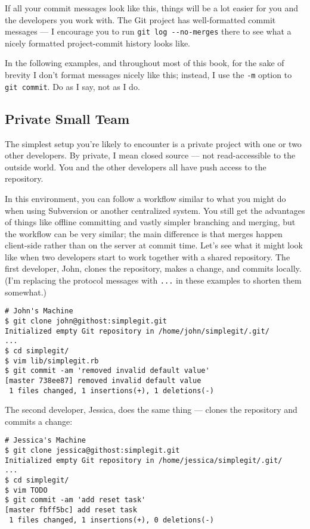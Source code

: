 \documentclass[a4paper]{book}
\begin{document}
If all your commit messages look like this, things will be a lot easier for you and the developers you work with. The Git project has well-formatted commit messages --- I encourage you to run \texttt{git log -{}-no-merges} there to see what a nicely formatted project-commit history looks like.

In the following examples, and throughout most of this book, for the sake of brevity I don't format messages nicely like this; instead, I use the \texttt{-m} option to \texttt{git commit}. Do as I say, not as I do.

\subsection{Private Small Team}

The simplest setup you're likely to encounter is a private project with one or two other developers. By private, I mean closed source --- not read-accessible to the outside world. You and the other developers all have push access to the repository.

In this environment, you can follow a workflow similar to what you might do when using Subversion or another centralized system. You still get the advantages of things like offline committing and vastly simpler branching and merging, but the workflow can be very similar; the main difference is that merges happen client-side rather than on the server at commit time. Let's see what it might look like when two developers start to work together with a shared repository. The first developer, John, clones the repository, makes a change, and commits locally. (I'm replacing the protocol messages with \texttt{...} in these examples to shorten them somewhat.)

\begin{shaded}\begin{verbatim}
# John's Machine
$ git clone john@githost:simplegit.git
Initialized empty Git repository in /home/john/simplegit/.git/
...
$ cd simplegit/
$ vim lib/simplegit.rb
$ git commit -am 'removed invalid default value'
[master 738ee87] removed invalid default value
 1 files changed, 1 insertions(+), 1 deletions(-)
\end{verbatim}\end{shaded}

The second developer, Jessica, does the same thing --- clones the repository and commits a change:

\begin{shaded}\begin{verbatim}
# Jessica's Machine
$ git clone jessica@githost:simplegit.git
Initialized empty Git repository in /home/jessica/simplegit/.git/
...
$ cd simplegit/
$ vim TODO
$ git commit -am 'add reset task'
[master fbff5bc] add reset task
 1 files changed, 1 insertions(+), 0 deletions(-)
\end{verbatim}\end{shaded}
\end{document}
